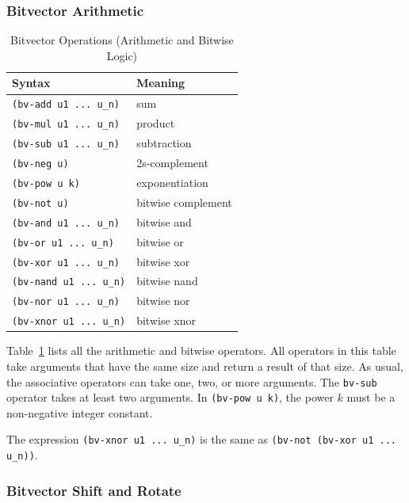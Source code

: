 \documentclass[11pt,twoside,fleqn,openright,titlepage]{cslreport}
\begin{document}
\subsubsection*{Bitvector Arithmetic}

\begin{table}
\begin{small}
\begin{center}
\begin{tabular}{|p{5cm}|l|}
\hline Syntax & Meaning \\ 
\hline
\texttt{(bv-add u1 ... u\_n)} & sum \\
\texttt{(bv-mul u1 ... u\_n)} & product \\
\texttt{(bv-sub u1 ... u\_n)} & subtraction \\
\texttt{(bv-neg u)} & 2s-complement \\
\texttt{(bv-pow u k)} & exponentiation \\
\hline
\texttt{(bv-not u)} & bitwise complement \\
\texttt{(bv-and u1 ... u\_n)} & bitwise and \\
\texttt{(bv-or u1 ... u\_n)} & bitwise or \\
\texttt{(bv-xor u1 ... u\_n)} & bitwise xor \\
\texttt{(bv-nand u1 ... u\_n)} & bitwise nand \\
\texttt{(bv-nor u1 ... u\_n)} & bitwise nor \\
\texttt{(bv-xnor u1 ... u\_n)} & bitwise xnor \\
\hline
\end{tabular}
\end{center}
\end{small}
\caption{Bitvector Operations (Arithmetic and Bitwise Logic)}
\label{bitvectors1}
\end{table}

Table~\ref{bitvectors1} lists all the arithmetic and bitwise
operators. All operators in this table take arguments that have the
same size and return a result of that size.  As usual, the associative
operators can take one, two, or more arguments. The \texttt{bv-sub}
operator takes at least two arguments. In \texttt{(bv-pow u k)},
the power $k$ must be a non-negative integer constant.

\medskip\noindent
The expression \texttt{(bv-xnor u1 ... u\_n)} is the same as
\texttt{(bv-not (bv-xor u1 ... u\_n))}.

\subsubsection*{Bitvector Shift and Rotate}
\end{document}
